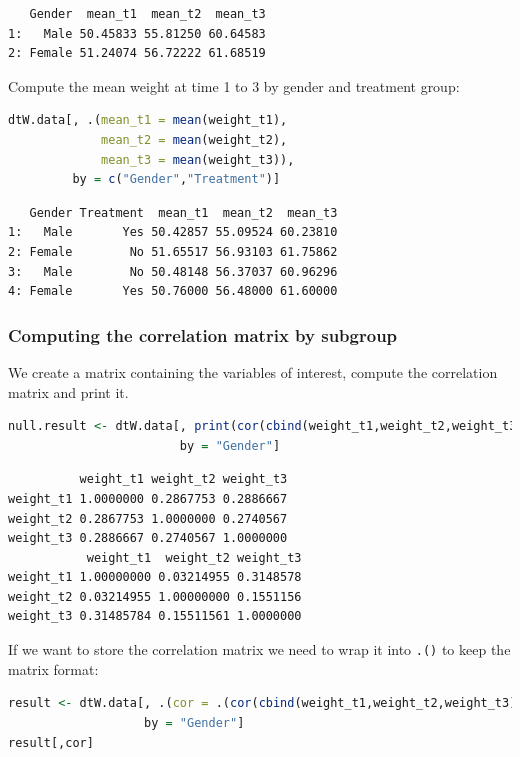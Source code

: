 \documentclass{article}
\begin{document}
\label{}
\begin{verbatim}
   Gender  mean_t1  mean_t2  mean_t3
1:   Male 50.45833 55.81250 60.64583
2: Female 51.24074 56.72222 61.68519
\end{verbatim}


Compute the mean weight at time 1 to 3 by gender and treatment group:
\begin{lstlisting}[language=r,numbers=none]
dtW.data[, .(mean_t1 = mean(weight_t1),
             mean_t2 = mean(weight_t2),
             mean_t3 = mean(weight_t3)), 
         by = c("Gender","Treatment")]
\end{lstlisting}

\label{}
\begin{verbatim}
   Gender Treatment  mean_t1  mean_t2  mean_t3
1:   Male       Yes 50.42857 55.09524 60.23810
2: Female        No 51.65517 56.93103 61.75862
3:   Male        No 50.48148 56.37037 60.96296
4: Female       Yes 50.76000 56.48000 61.60000
\end{verbatim}
\subsubsection{Computing the correlation matrix by subgroup}
\label{sec:org5dbd15f}

We create a matrix containing the variables of interest, compute the
correlation matrix and print it.
\begin{lstlisting}[language=r,numbers=none]
null.result <- dtW.data[, print(cor(cbind(weight_t1,weight_t2,weight_t3))), 
                        by = "Gender"]
\end{lstlisting}

\label{}
\begin{verbatim}
          weight_t1 weight_t2 weight_t3
weight_t1 1.0000000 0.2867753 0.2886667
weight_t2 0.2867753 1.0000000 0.2740567
weight_t3 0.2886667 0.2740567 1.0000000
           weight_t1  weight_t2 weight_t3
weight_t1 1.00000000 0.03214955 0.3148578
weight_t2 0.03214955 1.00000000 0.1551156
weight_t3 0.31485784 0.15511561 1.0000000
\end{verbatim}


If we want to store the correlation matrix we need to wrap it into
\texttt{.()} to keep the matrix format:
\begin{lstlisting}[language=r,numbers=none]
result <- dtW.data[, .(cor = .(cor(cbind(weight_t1,weight_t2,weight_t3)))), 
                   by = "Gender"]
result[,cor]
\end{lstlisting}
\end{document}
